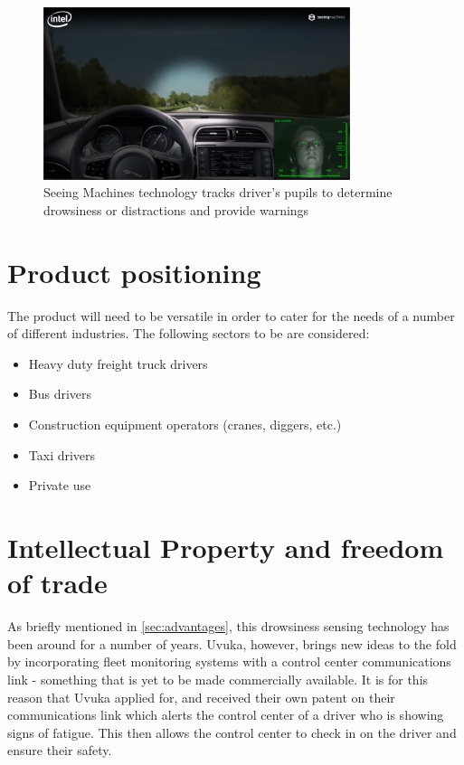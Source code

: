 \begin{figure}[H]
\centering
\includegraphics[width=0.8\textwidth]{images/seeingmachines.png}
\vskip10pt
\caption[Toyota driver alertness system]{Seeing Machines technology tracks driver's pupils to determine drowsiness or distractions and provide warnings \cite{sm_similarities}}
\label{fig:sm_video}
\end{figure}

\section{Product positioning}
The product will need to be versatile in order to cater for the needs of a number of different industries. The following sectors to be are considered:
\begin{itemize}
\item Heavy duty freight truck drivers
\item Bus drivers
\item Construction equipment operators (cranes, diggers, etc.)
\item Taxi drivers
\item Private use
\end{itemize}

\section{Intellectual Property and freedom of trade}
As briefly mentioned in \cref{sec:advantages}, this drowsiness sensing technology has been around for a number of years. Uvuka, however, brings new ideas to the fold by incorporating fleet monitoring systems with a control center communications link - something that is yet to be made commercially available. It is for this reason that Uvuka applied for, and received their own patent on their communications link which alerts the control center of a driver who is showing signs of fatigue. This then allows the control center to check in on the driver and ensure their safety.

